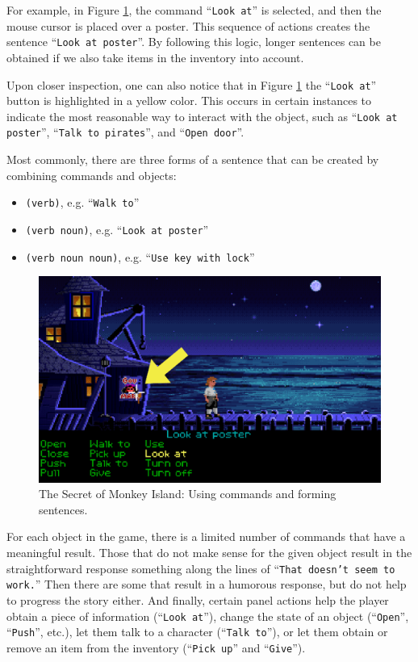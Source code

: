 For example, in Figure \ref{fig:C-TSoMI}, the command “\texttt{Look at}” is selected, and then the mouse cursor is placed over a poster. This sequence of actions creates the sentence “\texttt{Look at poster}”. By following this logic, longer sentences can be obtained if we also take items in the inventory into account. 

Upon closer inspection, one can also notice that in Figure \ref{fig:C-TSoMI} the “\texttt{Look at}” button is highlighted in a yellow color. This occurs in certain instances to indicate the most reasonable way to interact with the object, such as “\texttt{Look at poster}”, “\texttt{Talk to pirates}”, and “\texttt{Open door}”.

Most commonly, there are three forms of a sentence that can be created by combining commands and objects:
\begin{itemize}
    \item \verb|(verb)|, e.g. “\texttt{Walk to}”
    \item \verb|(verb noun)|, e.g. “\texttt{Look at poster}”
    \item \verb|(verb noun noun)|, e.g. “\texttt{Use key with lock}”
\end{itemize}

\begin{figure}[H]
\centering
\includegraphics[width=.8\linewidth]{img/C-TSoMI.png}
\caption{The Secret of Monkey Island: Using commands and forming sentences.}
\label{fig:C-TSoMI}
\end{figure}
 
For each object in the game, there is a limited number of commands that have a meaningful result. Those that do not make sense for the given object result in the straightforward response something along the lines of “\texttt{That doesn't seem to work.}”  Then there are some that result in a humorous response, but do not help to progress the story either. And finally, certain panel actions help the player obtain a piece of information (“\texttt{Look at}”), change the state of an object (“\texttt{Open}”, “\texttt{Push}”, etc.), let them talk to a character (“\texttt{Talk to}”), or let them obtain or remove an item from the inventory (“\texttt{Pick up}” and “\texttt{Give}”).

